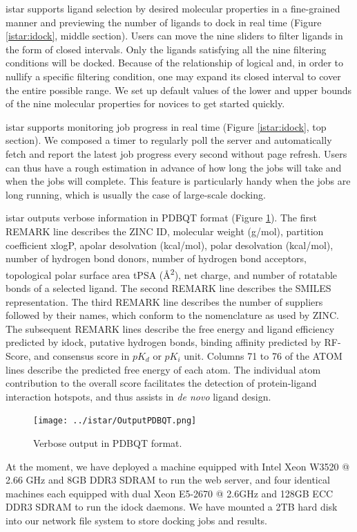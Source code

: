 istar supports ligand selection by desired molecular properties in a fine-grained manner and previewing the number of ligands to dock in real time (Figure \ref{istar:idock}, middle section). Users can move the nine sliders to filter ligands in the form of closed intervals. Only the ligands satisfying all the nine filtering conditions will be docked. Because of the relationship of logical and, in order to nullify a specific filtering condition, one may expand its closed interval to cover the entire possible range. We set up default values of the lower and upper bounds of the nine molecular properties for novices to get started quickly.

istar supports monitoring job progress in real time (Figure \ref{istar:idock}, top section). We composed a timer to regularly poll the server and automatically fetch and report the latest job progress every second without page refresh. Users can thus have a rough estimation in advance of how long the jobs will take and when the jobs will complete. This feature is particularly handy when the jobs are long running, which is usually the case of large-scale docking.

istar outputs verbose information in PDBQT format (Figure \ref{istar:OutputPDBQT}). The first REMARK line describes the ZINC ID, molecular weight (g/mol), partition coefficient xlogP, apolar desolvation (kcal/mol), polar desolvation (kcal/mol), number of hydrogen bond donors, number of hydrogen bond acceptors, topological polar surface area tPSA (\AA\textsuperscript{2}), net charge, and number of rotatable bonds of a selected ligand. The second REMARK line describes the SMILES representation. The third REMARK line describes the number of suppliers followed by their names, which conform to the nomenclature as used by ZINC. The subsequent REMARK lines describe the free energy and ligand efficiency predicted by idock, putative hydrogen bonds, binding affinity predicted by RF-Score, and consensus score in $pK_d$ or $pK_i$ unit. Columns 71 to 76 of the ATOM lines describe the predicted free energy of each atom. The individual atom contribution to the overall score facilitates the detection of protein-ligand interaction hotspots, and thus assists in \textit{de novo} ligand design.

\begin{figure}
\centering
\texttt{[image: ../istar/OutputPDBQT.png]}
\caption{Verbose output in PDBQT format.}
\label{istar:OutputPDBQT}
\end{figure}

At the moment, we have deployed a machine equipped with Intel Xeon W3520 @ 2.66 GHz and 8GB DDR3 SDRAM to run the web server, and four identical machines each equipped with dual Xeon E5-2670 @ 2.6GHz and 128GB ECC DDR3 SDRAM to run the idock daemons. We have mounted a 2TB hard disk into our network file system to store docking jobs and results.

